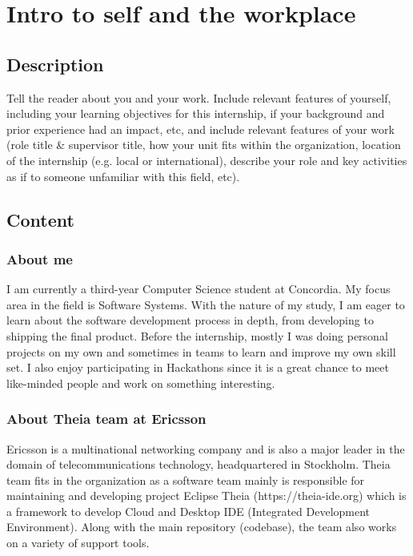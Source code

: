 \newpage
\section{Intro to self and the workplace}

\subsection{Description}
Tell the reader about you and your work. Include relevant features of yourself, including your learning objectives for this internship, if your background and prior experience had an impact, etc, and include relevant features of your work (role title \& supervisor title, how your unit fits within the organization, location of the internship (e.g. local or international), describe your role and key activities as if to someone unfamiliar with this field, etc).

\subsection{Content}

\subsubsection{About me}
I am currently a third-year Computer Science student at Concordia. 
My focus area in the field is Software Systems. 
With the nature of my study, I am eager to learn about the software development process in depth, from developing to shipping the final product.
Before the internship, mostly I was doing personal projects on my own and sometimes in teams to learn and improve my own skill set.
I also enjoy participating in Hackathons since it is a great chance to meet like-minded people and work on something interesting.

\newpage
\subsubsection{About Theia team at Ericsson}
Ericsson is a multinational networking company and is also a major leader in the domain of telecommunications technology, headquartered in Stockholm.
Theia team fits in the organization as a software team mainly is responsible for maintaining and developing project Eclipse Theia (https://theia-ide.org)
which is a framework to develop Cloud and Desktop IDE (Integrated Development Environment).
Along with the main repository (codebase), the team also works on a variety of support tools.

